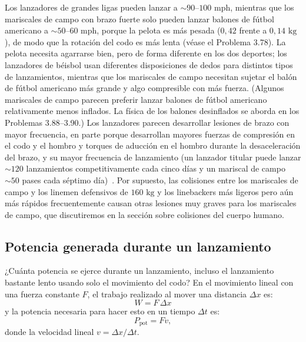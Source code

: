\documentclass[12pt]{book}
\begin{document}
Los lanzadores de grandes ligas pueden lanzar a $\sim 90$--$100\text{ mph}$, mientras que los mariscales de campo con brazo fuerte solo pueden lanzar balones de fútbol americano a $\sim 50$--$60\text{ mph}$, porque la pelota es más pesada ($0{,}42$ frente a $0{,}14\text{ kg}$), de modo que la rotación del codo es más lenta (véase el Problema 3.78). La pelota necesita agarrarse bien, pero de forma diferente en los dos deportes; los lanzadores de béisbol usan diferentes disposiciones de dedos para distintos tipos de lanzamientos, mientras que los mariscales de campo necesitan sujetar el balón de fútbol americano más grande y algo compresible con más fuerza. (Algunos mariscales de campo parecen preferir lanzar balones de fútbol americano relativamente menos inflados. La física de los balones desinflados se aborda en los Problemas 3.88--3.90.) Los lanzadores parecen desarrollar lesiones de brazo con mayor frecuencia, en parte porque desarrollan mayores fuerzas de compresión en el codo y el hombro y torques de aducción en el hombro durante la desaceleración del brazo, y su mayor frecuencia de lanzamiento (un lanzador titular puede lanzar $\sim 120$ lanzamientos competitivamente cada cinco días y un mariscal de campo $\sim 50$ pases cada séptimo día)~\cite{ref47}. Por supuesto, las colisiones entre los mariscales de campo y los linemen defensivos de $160\text{ kg}$ y los linebackers más ligeros pero aún más rápidos frecuentemente causan otras lesiones muy graves para los mariscales de campo, que discutiremos en la sección sobre colisiones del cuerpo humano.

\subsection{Potencia generada durante un lanzamiento}

¿Cuánta potencia se ejerce durante un lanzamiento, incluso el lanzamiento bastante lento usando solo el movimiento del codo? En el movimiento lineal con una fuerza constante $F$, el trabajo realizado al mover una distancia $\Delta x$ es:
\begin{equation}
W = F\,\Delta x
\label{eq:3.86}
\end{equation}
y la potencia necesaria para hacer esto en un tiempo $\Delta t$ es:
\begin{equation}
P_{\text{pot}} = F v,
\label{eq:3.87}
\end{equation}
donde la velocidad lineal $v = \Delta x / \Delta t$.
\end{document}
